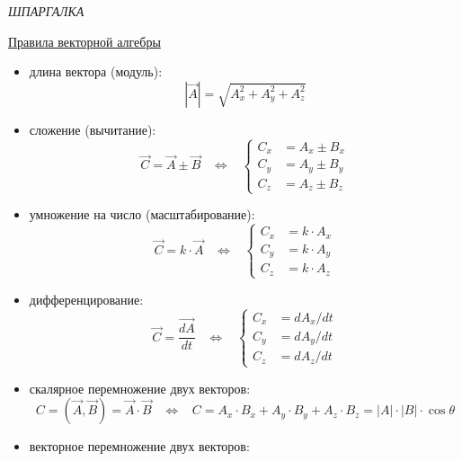 \begin{flushright}
{\color{green}\LARGE\sl ШПАРГАЛКА}
\end{flushright}
\centerline{\huge\underline{Правила векторной алгебры}}
\begin{itemize}
\item длина вектора (модуль):
 \begin{displaymath}
 |\vec{A}| = \sqrt{A_x^2+A_y^2+A_z^2}
 \end{displaymath}
\item сложение (вычитание):
 \begin{displaymath}
 \vec{C} = \vec{A} \pm \vec{B}\;\;\;\Leftrightarrow\;\;\;
 \left\{\begin{array}{cc}C_x &= A_x\pm B_x\\
                         C_y &= A_y\pm B_y\\
                         C_z &= A_z\pm B_z\end{array}\right.
 \end{displaymath}
\item умножение на число (масштабирование):
 \begin{displaymath}
 \vec{C} = k\cdot\vec{A} \;\;\;\Leftrightarrow\;\;\;
 \left\{\begin{array}{cc}C_x &= k\cdot A_x\\
                         C_y &= k\cdot A_y\\
                         C_z &= k\cdot A_z\end{array}\right.
 \end{displaymath}
\item дифференцирование:
 \begin{displaymath}
 \vec{C} = \frac{\vec{dA}}{dt} \;\;\;\Leftrightarrow\;\;\;
 \left\{\begin{array}{cc}C_x &= {dA_x}/{dt}\\
                         C_y &= {dA_y}/{dt}\\
                         C_z &= {dA_z}/{dt}\end{array}\right.
 \end{displaymath}
\item скалярное перемножение двух векторов:
 \begin{displaymath}
 C = \left(\vec{A},\vec{B}\right) = \vec{A}\cdot\vec{B}\;\;\;\Leftrightarrow\;\;\;
 C = A_x\cdot B_x + A_y\cdot B_y + A_z\cdot B_z =|A|\cdot|B|\cdot \cos\theta
\end{displaymath}
\item векторное перемножение двух векторов:

\end{itemize}
